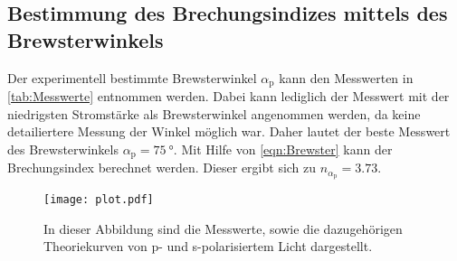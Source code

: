 \subsection{Bestimmung des Brechungsindizes mittels des Brewsterwinkels}
\label{subsec:Brewsterwinkel}
Der experimentell bestimmte Brewsterwinkel $\alpha_\text{p}$ kann den Messwerten in \autoref{tab:Messwerte} entnommen werden. Dabei kann lediglich der Messwert mit der 
niedrigsten Stromstärke als Brewsterwinkel angenommen werden, da keine detailiertere Messung der Winkel möglich war.
Daher lautet der beste Messwert des Brewsterwinkels $\alpha_\text{p} = \qty{75}{\degree}$.
Mit Hilfe von \autoref{eqn:Brewster} kann der Brechungsindex berechnet werden. Dieser ergibt sich zu $n_{\alpha_{\text{p}}} = \num{3.73}$.

\begin{figure}
  \centering
  \texttt{[image: plot.pdf]}
  \caption{In dieser Abbildung sind die Messwerte, sowie die dazugehörigen Theoriekurven von p- und s-polarisiertem Licht dargestellt.}
  \label{fig:plot}
\end{figure}

